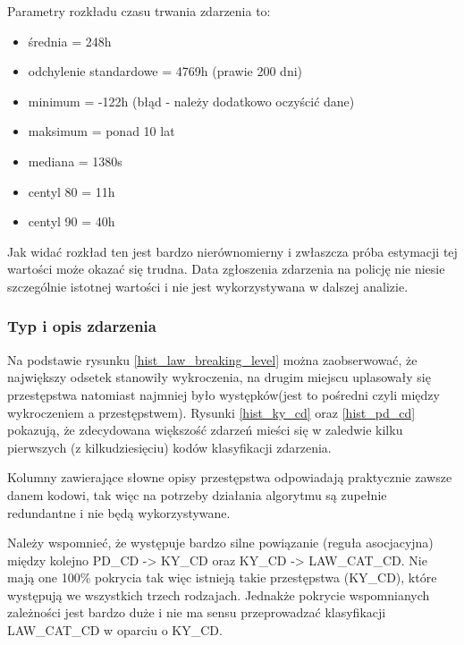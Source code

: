 \documentclass{classrep}
\begin{document}
{{{                Parametry rozkładu czasu trwania zdarzenia to:
                \begin{itemize}
                    \item średnia = 248h
                    \item odchylenie standardowe = 4769h (prawie 200 dni)
                    \item minimum = -122h (błąd - należy dodatkowo oczyścić dane)
                    \item maksimum = ponad 10 lat
                    \item mediana = 1380s
                    \item centyl 80 = 11h
                    \item centyl 90 = 40h
                \end{itemize}
                Jak widać rozkład ten jest bardzo nierównomierny i zwłaszcza próba
                estymacji tej wartości może okazać się trudna. Data zgłoszenia
                zdarzenia na policję nie niesie szczególnie istotnej wartości i nie
                jest wykorzystywana w dalszej analizie.
            }

            \subsubsection{Typ i opis zdarzenia} {
                Na podstawie rysunku \ref{hist_law_breaking_level} można zaobserwować,
                że największy odsetek stanowiły wykroczenia, na drugim miejscu
                uplasowały się przestępstwa natomiast najmniej było występków(jest to
                pośredni czyli między wykroczeniem a przestępstwem). Rysunki
                \ref{hist_ky_cd} oraz \ref{hist_pd_cd} pokazują, że zdecydowana
                większość zdarzeń mieści się w zaledwie kilku pierwszych (z
                kilkudziesięciu) kodów klasyfikacji zdarzenia.

                Kolumny zawierające słowne opisy przestępstwa odpowiadają praktycznie
                zawsze danem kodowi, tak więc na potrzeby działania algorytmu są
                zupełnie redundantne i nie będą wykorzystywane.

                Należy wspomnieć, że występuje bardzo silne powiązanie (reguła
                asocjacyjna) między kolejno PD\_CD -> KY\_CD oraz KY\_CD ->
                LAW\_CAT\_CD. Nie mają one 100\% pokrycia tak więc istnieją takie
                przestępstwa (KY\_CD), które występują we wszystkich trzech rodzajach.
                Jednakże pokrycie wspomnianych zależności jest bardzo duże i nie ma
                sensu przeprowadzać klasyfikacji LAW\_CAT\_CD w oparciu o KY\_CD.

}}}
\end{document}
